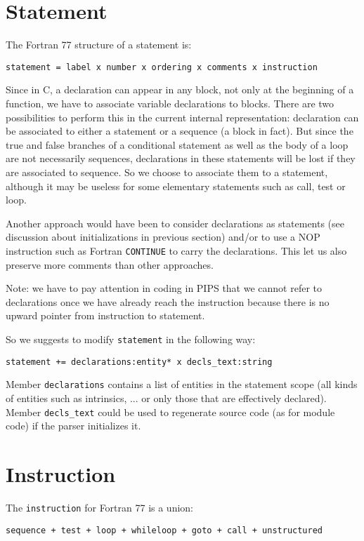 \documentclass[a4paper]{report}
\begin{document}
\section{Statement}
\label{statement}
 
The Fortran 77 structure of a statement is:
 
\verb/statement = label x number x ordering x comments x instruction/

Since in C, a declaration can appear in any block, not only at the
beginning of a function, we have to associate variable declarations to
blocks. There are two possibilities to perform this in the current
internal representation: declaration can be associated to either a
statement or a sequence (a block in fact). But since the true and
false branches of a conditional statement as well as the body of a
loop are not necessarily sequences, declarations in these statements
will be lost if they are associated to sequence. So we choose to
associate them to a statement, although it may be useless for some
elementary statements such as call, test or loop.

Another approach would have been to consider declarations as
statements (see discussion about initializations in previous section)
and/or to use a NOP instruction such as Fortran \verb/CONTINUE/ to
carry the declarations. This let us also preserve more comments than
other approaches.

Note: we have to pay attention in coding in PIPS that we cannot refer
to declarations once we have already reach the instruction because
there is no upward pointer from instruction to statement.

So we suggests to modify \verb/statement/ in the following way:

\verb/statement += declarations:entity* x decls_text:string/

Member \verb/declarations/ contains a list of entities in the
statement scope (all kinds of entities such as intrinsics, ... or only
those that are effectively declared).  Member \verb/decls_text/ could
be used to regenerate source code (as for module code) if the parser
initializes it.

\section{Instruction}

The \verb/instruction/ for Fortran 77 is a union:

\verb/sequence + test + loop + whileloop + goto + call + unstructured/
\end{document}
